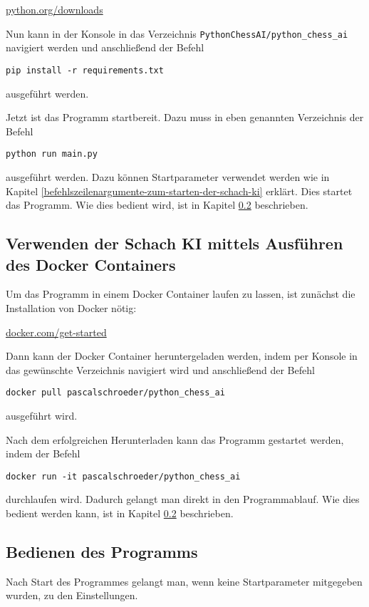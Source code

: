 \href{https://www.python.org/downloads/}{python.org/downloads}

Nun kann in der Konsole in das Verzeichnis
\texttt{PythonChessAI/python\_chess\_ai} navigiert werden und
anschließend der Befehl

\texttt{pip\ install\ -r\ requirements.txt}

ausgeführt werden.

Jetzt ist das Programm startbereit. Dazu muss in eben genannten
Verzeichnis der Befehl

\texttt{python\ run\ main.py}

ausgeführt werden. Dazu können Startparameter verwendet werden wie in
Kapitel \ref{befehlszeilenargumente-zum-starten-der-schach-ki} erklärt. Dies startet das Programm. Wie dies bedient
wird, ist in Kapitel \ref{bedienen-des-programms} beschrieben.

\subsection{Verwenden der Schach KI mittels Ausführen des Docker
Containers}\label{verwenden-der-schach-ki-mittels-ausfuxfchren-des-docker-containers}

Um das Programm in einem Docker Container laufen zu lassen, ist zunächst
die Installation von Docker nötig:

\href{https://www.docker.com/get-started}{docker.com/get-started}

Dann kann der Docker Container heruntergeladen werden, indem per Konsole
in das gewünschte Verzeichnis navigiert wird und anschließend der Befehl

\texttt{docker\ pull\ pascalschroeder/python\_chess\_ai}

ausgeführt wird.

Nach dem erfolgreichen Herunterladen kann das Programm gestartet werden,
indem der Befehl

\texttt{docker\ run\ -it\ pascalschroeder/python\_chess\_ai}

durchlaufen wird. Dadurch gelangt man direkt in den Programmablauf. Wie
dies bedient werden kann, ist in Kapitel \ref{bedienen-des-programms} beschrieben.

\subsection{Bedienen des Programms}\label{bedienen-des-programms}

Nach Start des Programmes gelangt man, wenn keine Startparameter
mitgegeben wurden, zu den Einstellungen.

